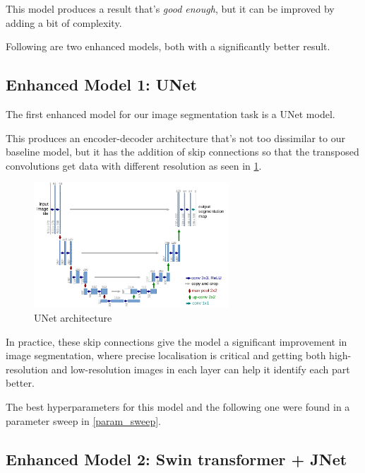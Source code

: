 This model produces a result that's \textit{good enough}, but it can be improved by adding a bit of complexity.

Following are two enhanced models, both with a significantly better result.

\subsection{Enhanced Model 1: UNet }

The first enhanced model for our image segmentation task is a UNet model\cite{unet}.

This produces an encoder-decoder architecture that's not too dissimilar to our baseline model, but it has the addition of skip connections so that the transposed convolutions get data with different resolution as seen in \cref{unet}.

\begin{figure}[h]
    \centering 
    \includegraphics[width=0.65\textwidth]{u-net-illustration-correct-scale2.pdf}
    \caption{UNet architecture}
    \label{unet}
\end{figure}

In practice, these skip connections give the model a significant improvement in image segmentation, where precise localisation is critical and getting both high-resolution and low-resolution images in each layer can help it identify each part better.

The best hyperparameters for this model and the following one were found in a parameter sweep in \cref{param_sweep}.

\subsection{Enhanced Model 2: Swin transformer + JNet }

